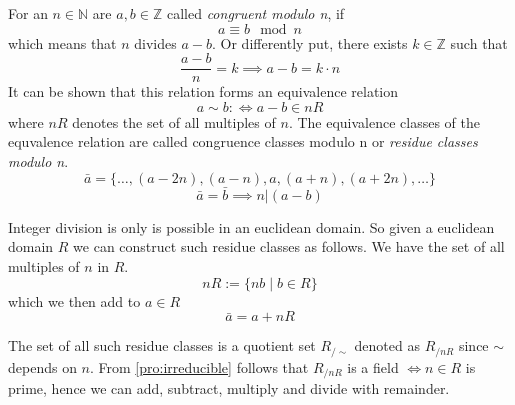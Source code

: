 For an \(n \in \mathbb{N}\) are \(a, b \in \mathbb{Z}\) called \textit{congruent modulo n}, if
\[a \equiv b \mod n\]
which means that \(n\) divides \(a - b\).
Or differently put, there exists \(k \in \mathbb{Z}\) such that
\[\frac{a - b}{n} = k \implies a - b = k \cdot n\]
It can be shown that this relation forms an equivalence relation
\[a \sim b :\iff a - b \in nR\]
where \(nR\) denotes the set of all multiples of \(n\).
The equivalence classes of the equvalence relation are called congruence classes modulo n or \textit{residue classes modulo n}.
\[\bar{a} = \{\ldots, (a-2n), (a-n), a, (a+n), (a+2n), \ldots\}\]
\[\bar{a} = \bar{b} \implies n | (a - b)\]

Integer division is only is possible in an euclidean domain.
So given a euclidean domain \(R\) we can construct such residue classes as follows.
We have the set of all multiples of \(n\) in \(R\).
\[nR := \{nb \mid b \in R\}\]
which we then add to \(a \in R\)
\[\bar{a} = a + nR\]

The set of all such residue classes is a quotient set \(R_{/\sim}\) denoted as \(R_{/nR}\) since \(\sim\) depends on \(n\).
From \cref{pro:irreducible} follows that \(R_{/nR}\) is a field \(\iff n \in R\) is prime, hence we can add, subtract, multiply and divide with remainder.

